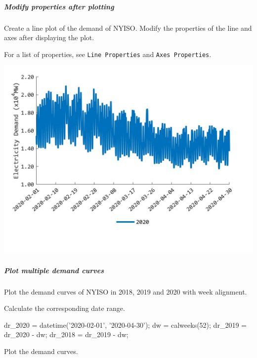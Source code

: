 \documentclass[11pt]{article}
\numberwithin{equation}{section}
\numberwithin{table}{section}
\numberwithin{figure}{section}
\begin{document}
\subparagraph{Modify properties after plotting}
Create a line plot of the demand of NYISO. Modify the properties of the line and axes after displaying the plot.


For a list of properties, see \verb!Line Properties! and \verb!Axes Properties!.

\begin{center}
  \noindent\includegraphics[width=\textwidth]{figures/plot_demand_example4.jpg}
\end{center}

\subparagraph{Plot multiple demand curves}
Plot the demand curves of NYISO in 2018, 2019 and 2020 with week alignment.

Calculate the corresponding date range.

\begin{Code}
  dr_2020 = datetime({'2020-02-01', '2020-04-30'});
  dw = calweeks(52);
  dr_2019 = dr_2020 - dw;
  dr_2018 = dr_2019 - dw;
\end{Code}

Plot the demand curves.

\end{document}
